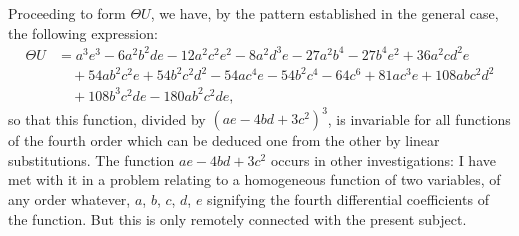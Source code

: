 \documentclass[11pt,a4paper]{article}
\theoremstyle{plain}
\theoremstyle{definition}
\theoremstyle{remark}
\begin{document}
Proceeding to form $\Theta U$, we have, by the pattern established in the general case,
the following expression:
\begin{align*}
\Theta U &= a^3e^3 - 6a^2b^2de - 12a^2c^2e^2 - 8a^2d^3e - 27a^2b^4 - 27b^4e^2 + 36a^2cd^2e \\
&\quad + 54ab^2c^2e + 54b^2c^2d^2 - 54ac^4e - 54b^2c^4 - 64c^6 + 81ac^3e + 108abc^2d^2 \\
&\quad + 108b^3c^2de - 180ab^2c^2de,
\end{align*}
so that this function, divided by $(ae - 4bd + 3c^2)^3$, is invariable for all functions of the
fourth order which can be deduced one from the other by linear substitutions. The
function $ae - 4bd + 3c^2$ occurs in other investigations: I have met with it in a problem
relating to a homogeneous function of two variables, of any order whatever, $a$, $b$, $c$, $d$, $e$
signifying the fourth differential coefficients of the function. But this is only remotely
connected with the present subject.
\end{document}
